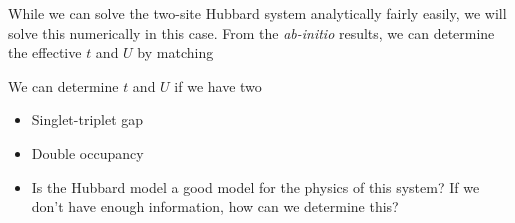 \documentclass[12pt]{article}
\begin{document}
While we can solve the two-site Hubbard system analytically fairly easily, we will solve this numerically in this case. 
From the {\it ab-initio} results, we can determine the effective $t$ and $U$ by matching 



We can determine $t$ and $U$ if we have two 

\begin{itemize}
\item Singlet-triplet gap
\item Double occupancy
\item Is the Hubbard model a good model for the physics of this system? If we don't have enough information, how can we determine this?
\end{itemize}
\end{document}
